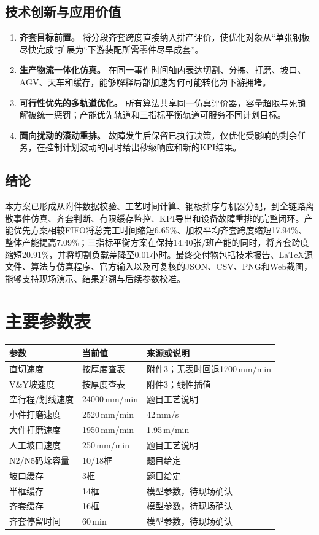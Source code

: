 \documentclass[UTF8,zihao=-4,openany]{ctexrep}
\begin{document}
\section{技术创新与应用价值}

\begin{enumerate}
  \item \textbf{齐套目标前置。} 将分段齐套跨度直接纳入排产评价，使优化对象从“单张钢板尽快完成”扩展为“下游装配所需零件尽早成套”。
  \item \textbf{生产物流一体化仿真。} 在同一事件时间轴内表达切割、分拣、打磨、坡口、AGV、天车和缓存，能够解释局部加速为何可能转化为下游拥堵。
  \item \textbf{可行性优先的多轨道优化。} 所有算法共享同一仿真评价器，容量超限与死锁解被统一惩罚；产能优先轨道和三指标平衡轨道可服务不同计划目标。
  \item \textbf{面向扰动的滚动重排。} 故障发生后保留已执行决策，仅优化受影响的剩余任务，在控制计划波动的同时给出秒级响应和新的KPI结果。
\end{enumerate}

\section{结论}

本方案已形成从附件数据校验、工艺时间计算、钢板排序与机器分配，到全链路离散事件仿真、齐套判断、有限缓存监控、KPI导出和设备故障重排的完整闭环。产能优先方案相较FIFO将总完工时间缩短6.65\%、加权平均齐套跨度缩短17.94\%、整体产能提高7.09\%；三指标平衡方案在保持14.40张/班产能的同时，将齐套跨度缩短20.91\%，并将切割负载差降至0.01小时。最终交付物包括技术报告、LaTeX源文件、算法与仿真程序、官方输入以及可复核的JSON、CSV、PNG和Web截图，能够支持现场演示、结果追溯与后续参数校准。

\appendix
\chapter{主要参数表}

\begin{longtable}{p{}p{}p{}}
\toprule
参数 & 当前值 & 来源或说明 \\
\midrule
直切速度 & 按厚度查表 & 附件3；无表时回退1700\,mm/min \\
V\&Y坡速度 & 按厚度查表 & 附件3；线性插值 \\
空行程/划线速度 & 24000\,mm/min & 题目工艺说明 \\
小件打磨速度 & 2520\,mm/min & 42\,mm/s \\
大件打磨速度 & 1950\,mm/min & 1.95\,m/min \\
人工坡口速度 & 250\,mm/min & 题目工艺说明 \\
N2/N5码垛容量 & 10/18框 & 题目给定 \\
坡口缓存 & 3框 & 题目给定 \\
半框缓存 & 14框 & 模型参数，待现场确认 \\
齐套缓存 & 16框 & 模型参数，待现场确认 \\
齐套停留时间 & 60\,min & 模型参数，待现场确认 \\
\bottomrule
\end{longtable}
\end{document}
